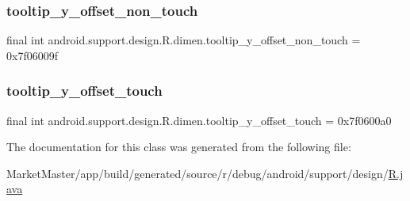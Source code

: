 \subsubsection{\texorpdfstring{tooltip\+\_\+y\+\_\+offset\+\_\+non\+\_\+touch}{tooltip\_y\_offset\_non\_touch}}
{\footnotesize\ttfamily final int android.\+support.\+design.\+R.\+dimen.\+tooltip\+\_\+y\+\_\+offset\+\_\+non\+\_\+touch = 0x7f06009f\hspace{0.3cm}{\ttfamily [static]}}

\mbox{\label{classandroid_1_1support_1_1design_1_1R_1_1dimen_a7e9207470a7236ed6fade4180fc9eeab}} 
\subsubsection{\texorpdfstring{tooltip\+\_\+y\+\_\+offset\+\_\+touch}{tooltip\_y\_offset\_touch}}
{\footnotesize\ttfamily final int android.\+support.\+design.\+R.\+dimen.\+tooltip\+\_\+y\+\_\+offset\+\_\+touch = 0x7f0600a0\hspace{0.3cm}{\ttfamily [static]}}



The documentation for this class was generated from the following file\+:\begin{DoxyCompactItemize}
\item 
Market\+Master/app/build/generated/source/r/debug/android/support/design/\mbox{\hyperlink{debug_2android_2support_2design_2R_8java}{R.\+java}}\end{DoxyCompactItemize}
